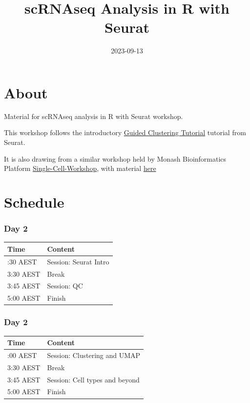 \documentclass[
]{book}
\title{scRNAseq Analysis in R with Seurat}
\author{}
\date{\vspace{-2.5em}2023-09-13}
\begin{document}
\maketitle

{
\setcounter{tocdepth}{1}
\tableofcontents
}
\hypertarget{about}{%
\chapter{About}\label{about}}

Material for scRNAseq analysis in R with Seurat workshop.

This workshop follows the introductory \href{https://satijalab.org/seurat/articles/pbmc3k_tutorial.html}{Guided Clustering Tutorial} tutorial from Seurat.

It is also drawing from a similar workshop held by Monash Bioinformatics Platform \href{https://monashbioinformaticsplatform.github.io/Single-Cell-Workshop/}{Single-Cell-Workshop}, with material \href{https://monashbioinformaticsplatform.github.io/Single-Cell-Workshop/pbmc3k_tutorial.html}{here}

\hypertarget{schedule}{%
\chapter{Schedule}\label{schedule}}

\hypertarget{day-2}{%
\subsection*{Day 2}\label{day-2}}

\begin{longtable}[]{@{}ll@{}}
\toprule\noalign{}
Time & Content \\
\midrule\noalign{}
\endhead
\bottomrule\noalign{}
\endlastfoot
2:30 AEST & Session: Seurat Intro \\
3:30 AEST & Break \\
3:45 AEST & Session: QC \\
5:00 AEST & Finish \\
\end{longtable}

\hypertarget{day-2-1}{%
\subsection*{Day 2}\label{day-2-1}}

\begin{longtable}[]{@{}ll@{}}
\toprule\noalign{}
Time & Content \\
\midrule\noalign{}
\endhead
\bottomrule\noalign{}
\endlastfoot
2:00 AEST & Session: Clustering and UMAP \\
3:30 AEST & Break \\
3:45 AEST & Session: Cell types and beyond \\
5:00 AEST & Finish \\
\end{longtable}
\end{document}
